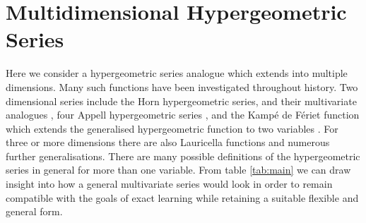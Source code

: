 \documentclass{article}
\begin{document}
\section{Multidimensional Hypergeometric Series}
Here we consider a hypergeometric series analogue which extends into multiple dimensions. Many such functions have been investigated throughout history. Two dimensional series include the Horn hypergeometric series, and their multivariate analogues \cite{Bytev2020}, four Appell hypergeometric series \cite{Carlson1963}, and the Kamp\'e de F\'eriet function which extends the generalised hypergeometric function to two variables \cite{KdF}. For three or more dimensions there are also Lauricella functions \cite{Carlson1963} and numerous further generalisations. There are many possible definitions of the hypergeometric series in general for more than one variable. From table \ref{tab:main} we can draw insight into how a general multivariate series would look in order to remain compatible with the goals of exact learning while retaining a suitable flexible and general form.\\
\end{document}
